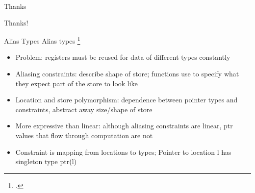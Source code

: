 \documentclass[aspectratio=169]{beamer}
\begin{document}
\begin{frame}{Thanks}
    \begin{center}
        \Huge{Thanks!}
    \end{center}
\end{frame}


\begin{frame}{Alias Types}
  Alias types \footcite{smith_alias_2000}
    \begin{itemize}
        \item Problem: registers must be reused for data of different types constantly
        \item Aliasing constraints: describe shape of store; functions use to specify what they expect part of the store to look like
        \item Location and store polymorphism: dependence between pointer types and constraints, abstract away size/shape of store
        \item More expressive than linear: although aliasing constraints are linear, ptr values that flow through computation are not
        \item Constraint is mapping from locations to types; Pointer to location l has singleton type ptr(l)
    \end{itemize}
\end{frame}
\end{document}
